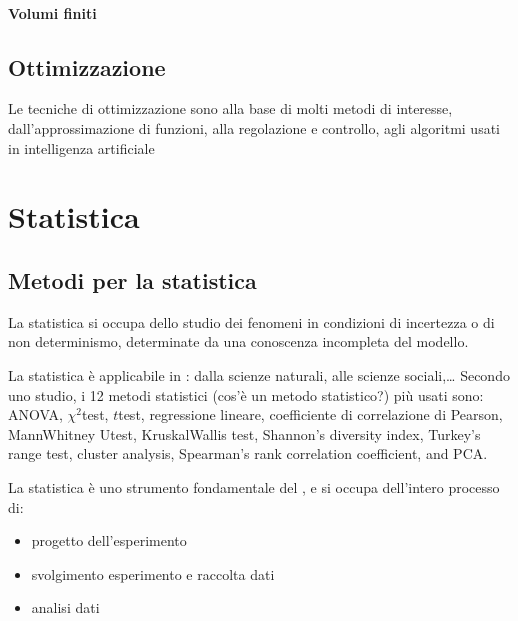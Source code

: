 \documentclass[letterpaper,10pt,italian]{jupyterBook}
\begin{document}
\subsection{Volumi finiti}
\label{\detokenize{ch/numerics/ode-boundary:volumi-finiti}}
\sphinxstepscope


\chapter{Ottimizzazione}
\label{\detokenize{ch/numerics/optimization:ottimizzazione}}\label{\detokenize{ch/numerics/optimization::doc}}
\sphinxAtStartPar
Le tecniche di ottimizzazione sono alla base di molti metodi di interesse, dall’approssimazione di funzioni, alla regolazione e controllo, agli algoritmi usati in intelligenza artificiale

\sphinxstepscope


\part{Statistica}

\sphinxstepscope


\chapter{Metodi per la statistica}
\label{\detokenize{ch/statistics:metodi-per-la-statistica}}\label{\detokenize{ch/statistics:book-statistics-hs}}\label{\detokenize{ch/statistics::doc}}
\sphinxAtStartPar
La statistica si occupa dello studio dei fenomeni in condizioni di incertezza o di non determinismo, determinate da una conoscenza incompleta del modello.



\sphinxAtStartPar
La statistica è applicabile in : dalla scienze naturali, alle scienze sociali,…
Secondo uno studio, i 12 metodi statistici (cos’è un metodo statistico?) più usati sono: ANOVA, \(\chi^2\)\sphinxhyphen{}test, \(t\)\sphinxhyphen{}test, regressione lineare, coefficiente di correlazione di Pearson, Mann\sphinxhyphen{}Whitney U\sphinxhyphen{}test, Kruskal\sphinxhyphen{}Wallis test, Shannon’s diversity index, Turkey’s range test, cluster analysis, Spearman’s rank correlation coefficient, and PCA.

\sphinxAtStartPar
La statistica è uno strumento fondamentale del , e si occupa dell’intero processo di:
\begin{itemize}
\item {} 
\sphinxAtStartPar
progetto dell’esperimento

\item {} 
\sphinxAtStartPar
svolgimento esperimento e raccolta dati

\item {} 
\sphinxAtStartPar
analisi dati

\end{itemize}
\end{document}
